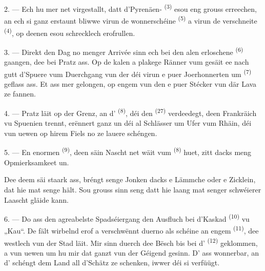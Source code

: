 2. --- Ech hu mer net virgestallt, datt d'Pyrenäen-
\textsuperscript{(3)} esou eng grouss  erreechen, an ech si ganz
erstaunt bliwwe virun de wonnerschéine  \textsuperscript{(5)} a
virun de verschneite  \textsuperscript{(4)}, op deenen esou
schrecklech  erofrullen.

\VUsaut{3.0mm}
\VUsaut{3.0mm}

3. --- Direkt den Dag no menger Arrivée sinn ech bei den alen erloschene
 \textsuperscript{(6)} gaangen, dee bei Pratz ass. Op de kalen a
plakege Ränner vum  gesäit ee nach gutt d'Spuere vum Duerchgang vun
der  déi virun e puer Joerhonnerten um 
\textsuperscript{(7)} geflass ass. Et ass mer gelongen, op engem vun den
 e puer Stécker vun där Lava ze fannen.

4. --- Pratz läit op der Grenz, an d' \textsuperscript{(8)}, déi den
 \textsuperscript{(27)} verdeedegt, deen Frankräich vu Spuenien
trennt, erënnert ganz un déi al Schlässer um Ufer vum Rhäin, déi vun uewen op hirem
Fiels no  ze lauere schéngen.

5. --- En enormen  \textsuperscript{(9)}, deen säin Nascht net wäit vum
 \textsuperscript{(8)} huet, zitt dacks meng Opmierksamkeet un.

Dee  deem säi  staark ass, bréngt senge Jonken
dacks e Lämmche oder e Zicklein, dat hie mat senge  hält. Sou grouss
sinn seng  datt hie laang mat senger schwéierer Laascht gläide
kann.

\VUsaut{3.0mm}
\VUsaut{3.0mm}

6. --- Do ass den agreabelste Spadséiergang den Ausfluch bei d'Kaskad
\textsuperscript{(10)} vu „Kau“. De  fält wirbelnd erof a
verschwënnt duerno als schéine  an engem 
\textsuperscript{(11)}, dee westlech vun der Stad läit. Mir sinn duerch dee Bësch bis
bei d' \textsuperscript{(12)} geklommen, a vun
uewen um  hu mir dat ganzt  vun der Géigend gesinn.
D' ass wonnerbar, an d' schéngt dem Land all
d'Schätz ze schenken, iwwer déi si verfüügt.

